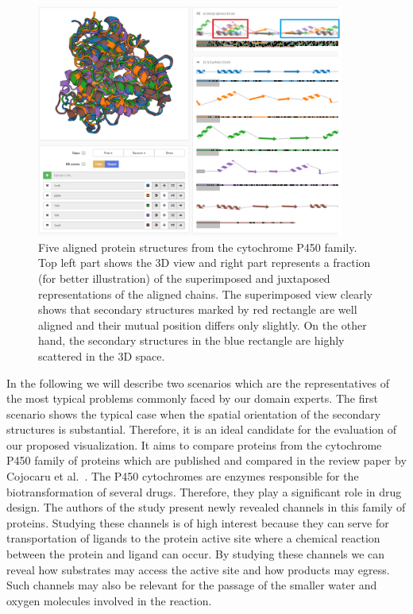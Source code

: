 \documentclass[twocolumn]{bmcart}%
\begin{document}
\begin{figure}[t!]
  \centering
  \includegraphics[width=0.9\textwidth]{pics/five.png}
  \caption{Five aligned protein structures from the cytochrome P450 family. Top left part shows the 3D view and right part represents a fraction (for better illustration) of the superimposed and juxtaposed representations of the aligned chains. The superimposed view clearly shows that secondary structures marked by red rectangle are well aligned and their mutual position differs only slightly. On the other hand, the secondary structures in the blue rectangle are highly scattered in the 3D space.}
  \label{fig:five}
\end{figure}


In the following we will describe two scenarios which are the representatives of the most typical problems commonly faced by our domain experts.
The first scenario shows the typical case when the spatial orientation of the secondary structures is substantial.
Therefore, it is an ideal candidate for the evaluation of our proposed visualization.
It aims to compare proteins from the cytochrome P450 family of proteins which are published and compared in the review paper by Cojocaru et al.~\cite{Cojocaru2007}. 
The P450 cytochromes are enzymes responsible for the biotransformation of several drugs.
Therefore, they play a significant role in drug design.
The authors of the study present newly revealed channels in this family of proteins.
Studying these channels is of high interest because they can serve for transportation of ligands to the protein active site where a chemical reaction between the protein and ligand can occur.
By studying these channels we can reveal how substrates may access the active site and how products may egress. 
Such channels may also be relevant for the passage of the smaller water and oxygen molecules involved in the reaction. 
\end{document}
